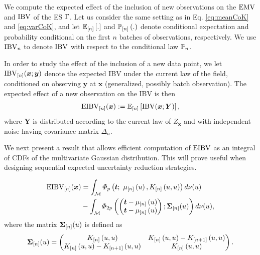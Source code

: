 \documentclass[aoas]{imsart}
\begin{document}
We compute the expected effect of the inclusion of new observations on
the $\operatorname{EMV}$ and $\operatorname{IBV}$ of the ES $\Gamma$. Let us consider the
same setting as in Eq. \eqref{eq:meanCoK} and \eqref{eq:varCoK}, and
let $\mathbb{E}_{[n]} \left[.\right]$ and $\mathbb{P}_{[n]} \left(.\right)$ denote conditional
expectation and probability conditional on the first $n$ batches of
observations, respectively. %
We use $\operatorname{IBV}_{n}$ to denote $\operatorname{IBV}$ with respect to the conditional law $\mathbb{P}_{n}$.

\medskip

In order to study the effect of the inclusion of a new data point, we
let $ \operatorname{IBV}_{[n]}(\bm{x}; \bm{y}) $ denote the expected IBV under the
current law of the field, conditioned on observing $\bm{y}$ at $\bm{x}$
(generalized, possibly batch observation). The expected effect of a
new observation on the IBV is then 
\begin{equation}\label{def:eibv}
    \currentEIBV(\bm{x}):=\currentExp{\mbox{IBV}(\bm{x}; \bm{Y})},
\end{equation}
where $\bm{Y}$ is distributed according to the current law of
$Z_{\bm{x}}$ and with independent noise having covariance matrix
$\Delta_n$.

We next present a result that allows efficient computation of $\operatorname{EIBV}$
as an integral of CDFs of the multivariate Gaussian distribution. This will prove
useful when designing sequential expected uncertainty reduction strategies.

\begin{propo}
\label{propo_eibv}
\begin{equation}
\begin{split}
\currentEIBV(\bm{x})
&=\int_{\domain} \varPhi_{\no}\left(\bt;~\currentMean{\uu}, \currentCov{u, u}\right) d\mes(u)\\
&-\int_{\domain} \varPhi_{2\no}
\left(
\left(
\begin{matrix}
\bt-\currentMean{u}\\
\bt-\currentMean{u}
\end{matrix}
\right);
\mathbf{\Sigma}_{[n]}(\uu)
\right)
d\mes(u),
\end{split}
\end{equation}
where the matrix $\mathbf{\Sigma}_{[n]}(u)$ is defined as
\begin{equation*}
\begin{split}
\mathbf{\Sigma}_{[n]}(\uu)&=
\left(
\begin{matrix}
\currentCov{u, u} & \currentCov{u, u}-\futureCov{u, u}\\
\currentCov{u, u}-\futureCov{u, u} & \currentCov{u, u}
\end{matrix}
\right).\\
\end{split}
\end{equation*}
\end{propo}
\end{document}
